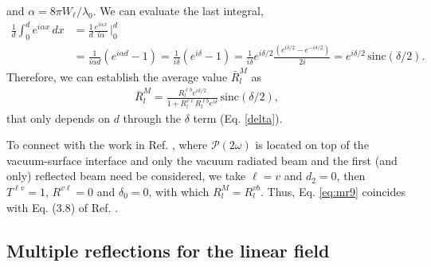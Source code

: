 and $\alpha=8\pi W_{\ell}/\lambda_{0}$. We can evaluate the last integral,
\begin{align}\label{eq:integral}
\frac{1}{d}\int_{0}^{d} e^{i\alpha x}\,dx
&= \frac{1}{d}\frac{e^{i\alpha x}}{i\alpha}\,\Bigg\vert^{d}_{0}\nonumber\\
&= \frac{1}{i\alpha d}\left(e^{i\alpha d} - 1\right)
 = \frac{1}{i\delta}\left(e^{i\delta} - 1\right)
 = \frac{1}{i\delta}e^{i\delta/2}\frac{(e^{i\delta/2} - e^{-i\delta/2})}{2i}
 = e^{i\delta/2}\,\mathrm{sinc}(\delta/2).
\end{align}
Therefore, we can establish the average value $\bar{R}^{M}_{l}$ as
\begin{align}\label{eq:mcave2}
\bar{R}^{M}_{l} = 
\frac{R^{\ell b}_{l}e^{i\delta/2}}{1 + R^{v\ell}_{l}R^{\ell b}_{l}e^{i\delta}}
\,\mathrm{sinc}(\delta/2),
\end{align}
that only depends on $d$ through the $\delta$ term (Eq. \eqref{delta}).

To connect with the work in Ref. \cite{mizrahiJOSA88}, where
$\boldsymbol{\mathcal{P}}(2\omega)$ is located on top of the vacuum-surface
interface and only the vacuum radiated beam and the first (and only) reflected
beam need be considered, we take $\ell = v$ and $d_{2} = 0$, then $T^{\ell v} =
1$, $R^{v\ell} = 0$ and $\delta_{0} = 0$, with which $R^{M}_{l}=R^{vb}_{l}$.
Thus, Eq. \eqref{eq:mr9} coincides with Eq. (3.8) of Ref. \cite{mizrahiJOSA88}.



\subsection{Multiple reflections for the linear field}

